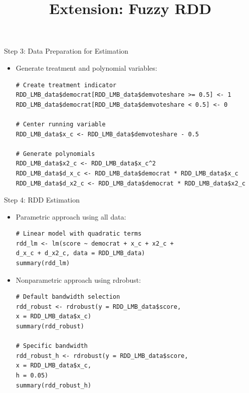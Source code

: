 \documentclass[hyperref={pdfpagelabels=false}]{beamer}
\begin{document}
\begin{frame}[fragile]{Step 3: Data Preparation for Estimation}
	\begin{itemize}
		\item Generate treatment and polynomial variables:
\begin{lstlisting}
# Create treatment indicator
RDD_LMB_data$democrat[RDD_LMB_data$demvoteshare >= 0.5] <- 1
RDD_LMB_data$democrat[RDD_LMB_data$demvoteshare < 0.5] <- 0

# Center running variable
RDD_LMB_data$x_c <- RDD_LMB_data$demvoteshare - 0.5

# Generate polynomials
RDD_LMB_data$x2_c <- RDD_LMB_data$x_c^2
RDD_LMB_data$d_x_c <- RDD_LMB_data$democrat * RDD_LMB_data$x_c
RDD_LMB_data$d_x2_c <- RDD_LMB_data$democrat * RDD_LMB_data$x2_c
\end{lstlisting}
	\end{itemize}
\end{frame}

\begin{frame}[fragile]{Step 4: RDD Estimation}
	\begin{itemize}
		\item Parametric approach using all data:
\begin{lstlisting}
# Linear model with quadratic terms
rdd_lm <- lm(score ~ democrat + x_c + x2_c + 
d_x_c + d_x2_c, data = RDD_LMB_data)
summary(rdd_lm)
\end{lstlisting}
		
		\item Nonparametric approach using rdrobust:
\begin{lstlisting}
# Default bandwidth selection
rdd_robust <- rdrobust(y = RDD_LMB_data$score, 
x = RDD_LMB_data$x_c)
summary(rdd_robust)

# Specific bandwidth
rdd_robust_h <- rdrobust(y = RDD_LMB_data$score, 
x = RDD_LMB_data$x_c,
h = 0.05)
summary(rdd_robust_h)
\end{lstlisting}
	\end{itemize}
\end{frame}






\title[]  
{Extension: Fuzzy RDD}


\author 
{}

\institute{}
\end{document}
